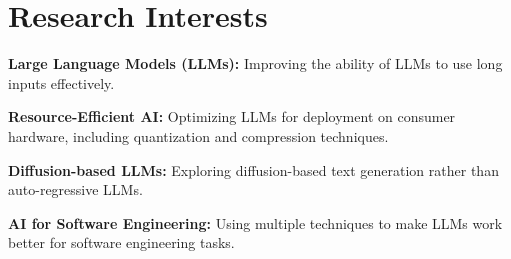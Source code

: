 \documentclass[]{resume-openfont}
\newcommand{\resumeHeading}[3]{\runsubsection{#1}\descript{ | #2 | #3}}
\begin{document}

\section{Research Interests}
\sectionsep
\begin{bullets}
    \item \textbf{Large Language Models (LLMs):} Improving the ability of LLMs to use long inputs effectively.
    \item \textbf{Resource-Efficient AI:}  Optimizing LLMs for deployment on consumer hardware, including quantization and compression techniques.
    \item \textbf{Diffusion-based LLMs:}  Exploring diffusion-based text generation rather than auto-regressive LLMs.
    \item \textbf{AI for Software Engineering:}  Using multiple techniques to make LLMs work better for software engineering tasks.
\end{bullets}
\sectionsep
\end{document}
